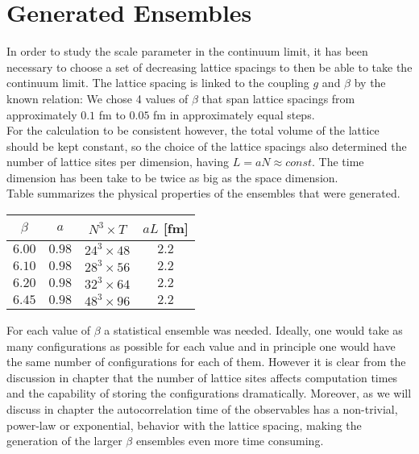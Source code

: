 \section{Generated Ensembles}
In order to study the scale parameter in the continuum limit, it has been necessary to choose a set of decreasing lattice spacings to then be able to take the continuum limit. The lattice spacing is linked to the coupling $g$ and $\beta$ by the known relation:
We chose 4 values of $\beta$ that span lattice spacings from approximately $0.1$ fm to $0.05$ fm in approximately equal steps. \\
For the calculation to be consistent however, the total volume of the lattice should be kept constant, so the choice of the lattice spacings also determined the number of lattice sites per dimension, having $L = aN\approx const$. The time dimension has been take to be twice as big as the space dimension.\\
Table \LINK summarizes the physical properties of the ensembles that were generated.
\begin{table}[!htb]
    \begin{center}
    \begin{tabular}{cccc}
        $\beta$ & $a$ & $N^3\times T$ & $aL$ [fm]\\\hline
        $6.00$ & $0.98$ & $24^3 \times 48$ & $2.2$\\
        $6.10$ & $0.98$ & $28^3 \times 56$ & $2.2$\\
        $6.20$ & $0.98$ & $32^3 \times 64$ & $2.2$\\
        $6.45$ & $0.98$ & $48^3 \times 96$ & $2.2$\\
    \end{tabular}
    \label{runs:ensembles}
    \end{center}
\end{table}
For each value of $\beta$ a statistical ensemble was needed. Ideally, one would take as many configurations as possible for each value and in principle one would have the same number of configurations for each of them. However it is clear from the discussion in chapter \LINK that the number of lattice sites affects computation times and the capability of storing the configurations dramatically. Moreover, as we will discuss in chapter \CIT the autocorrelation time of the observables has a non-trivial, power-law or exponential, behavior with the lattice spacing, making the generation of the larger $\beta$ ensembles even more time consuming.\\
